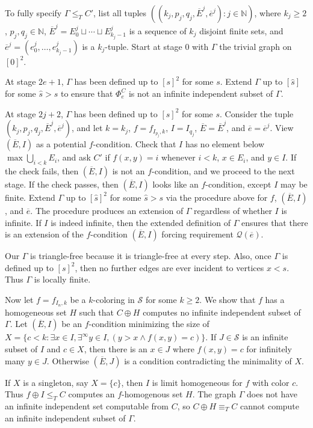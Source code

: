 \documentclass{article}
\def\Q{\mathcal{Q}}
\def\Sc{\mathcal{S}}
\def\Q{\mathcal{Q}}
\newcommand{\NN}[0]{\mathbb{N}}
\newcommand{\ol}[1]{\overline{#1}}
\numberwithin{theorem}{section}
\begin{document}
To fully specify $\Gamma \leq_T C'$, list all tuples $((k_j, p_j, q_j, \ol{E}^j, \ol{e}^j) : j \in \NN)$, where $k_j \geq 2$, $p_j, q_j \in \NN$, $\ol{E}^j = E^j_0 \sqcup \cdots \sqcup E^j_{k_j-1}$ is a sequence of $k_j$ disjoint finite sets, and $\ol{e}^j = (e^j_0, \dots, e^j_{k_j-1})$ is a $k_j$-tuple.  Start at stage $0$ with $\Gamma$ the trivial graph on $[0]^2$.

At stage $2e+1$, $\Gamma$ has been defined up to $[s]^2$ for some $s$.  Extend $\Gamma$ up to $[\hat{s}]$ for some $\hat{s} > s$ to ensure that $\Phi_e^C$ is not an infinite independent subset of $\Gamma$.

At stage $2j+2$, $\Gamma$ has been defined up to $[s]^2$ for some $s$.  Consider the tuple $(k_j, p_j, q_j, \ol{E}^j, \ol{e}^j)$, and let $k = k_j$, $f = f_{I_{p_j}, k}$, $I = I_{q_j}$, $\ol{E} = \ol{E}^j$, and $\ol{e} = \ol{e}^j$.  View $(\ol{E}, I)$ as a potential $f$-condition.  Check that $I$ has no element below $\max \bigcup_{i<k}E_i$, and ask $C'$ if $f(x,y) = i$ whenever $i < k$, $x \in E_i$, and $y \in I$.  If the check fails, then $(\ol{E}, I)$ is not an $f$-condition, and we proceed to the next stage.  If the check passes, then $(\ol{E}, I)$ looks like an $f$-condition, except $I$ may be finite.  Extend $\Gamma$ up to $[\hat{s}]^2$ for some $\hat{s} > s$ via the procedure above for $f$, $(\ol{E}, I)$, and $\ol{e}$.  The procedure produces an extension of $\Gamma$ regardless of whether $I$ is infinite.  If $I$ is indeed infinite, then the extended definition of $\Gamma$ ensures that there is an extension of the $f$-condition $(\ol{E}, I)$ forcing requirement $\Q(\ol{e})$.

Our $\Gamma$ is triangle-free because it is triangle-free at every step.  Also, once $\Gamma$ is defined up to $[s]^2$, then no further edges are ever incident to vertices $x < s$.  Thus $\Gamma$ is locally finite.

Now let $f = f_{I_n, k}$ be a $k$-coloring in $\Sc$ for some $k \geq 2$.  We show that $f$ has a homogeneous set $H$ such that $C \oplus H$ computes no infinite independent subset of $\Gamma$.  Let $(\ol{E}, I)$ be an $f$-condition minimizing the size of $X = \{c < k : \exists x \in I, \exists^\infty y \in I, (y > x \land f(x,y) = c)\}$.  If $J \in \Sc$ is an infinite subset of $I$ and $c \in X$, then there is an $x \in J$ where $f(x,y) = c$ for infinitely many $y \in J$.  Otherwise $(\ol{E}, J)$ is a condition contradicting the minimality of $X$.

If $X$ is a singleton, say $X = \{c\}$, then $I$ is limit homogeneous for $f$ with color $c$.  Thus $f \oplus I \leq_T C$ computes an $f$-homogenous set $H$.  The graph $\Gamma$ does not have an infinite independent set computable from $C$, so $C \oplus H \equiv_T C$ cannot compute an infinite independent subset of $\Gamma$.
\end{document}
